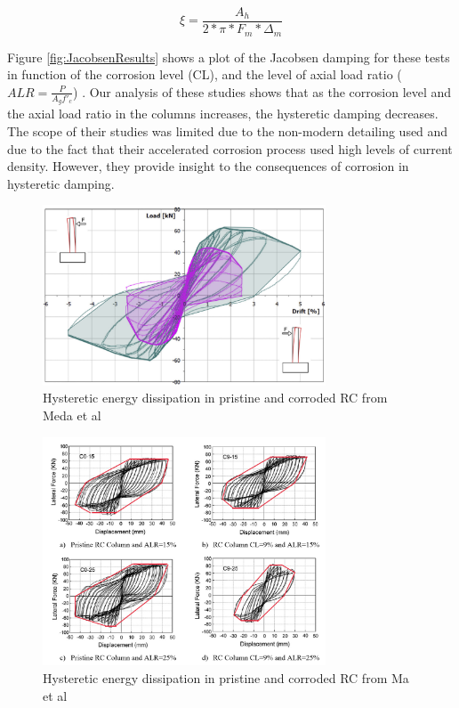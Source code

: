 \begin{equation}
    \xi=\frac{A_h}{2*\pi*F_m*\Delta_m}
    \label{eq:JacobsenEquation}
\end{equation}

Figure \ref{fig:JacobsenResults} shows a plot of the Jacobsen damping for these tests in function of the corrosion level (CL), and the level of axial load ratio ($ALR=\frac{P}{A_{g}f'_{c}}$) . Our analysis of these studies shows that as the corrosion level and the axial load ratio in the columns increases, the hysteretic damping decreases. The scope of their studies was limited due to the non-modern detailing used and due to the fact that their accelerated corrosion process used high levels of current density. However, they provide insight to the consequences of corrosion in hysteretic damping. 

\begin{figure}[htbp]
	\centering
    \includegraphics[width=0.75\textwidth]{VAC Prelim 2.0/Chapter-5/figs/Meda_HystereticArea_01.png}
	\caption{Hysteretic energy dissipation in pristine and corroded RC from Meda et al \cite{Meda2014}}
	\label{fig:MedaJacobsen}
\end{figure}

\begin{figure}[htbp]
	\centering
    \includegraphics[width=0.75\textwidth]{VAC Prelim 2.0/Chapter-5/figs/Ma_HystereticArea_01.png}
	\caption{Hysteretic energy dissipation in pristine and corroded RC from Ma et al \cite{Meda2014}}
	\label{fig:MaJacobsen}
\end{figure}

